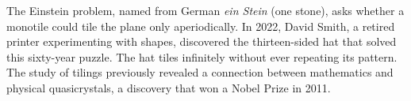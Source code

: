 The \QSOpen{}Einstein problem\QSClose{}, named from German \textit{\QSOpen{}ein Stein\QSClose{}} (one stone), asks whether a monotile could tile the plane only aperiodically. In 2022, David Smith, a retired printer experimenting with shapes, discovered the thirteen-sided \QSOpen{}hat\QSClose{} that solved this sixty-year puzzle. The hat tiles infinitely without ever repeating its pattern. The study of tilings previously revealed a connection between mathematics and physical quasicrystals, a discovery that won a Nobel Prize in 2011.
